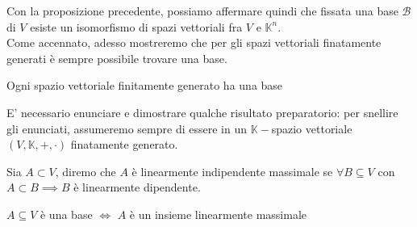 Con la proposizione precedente, possiamo affermare quindi che fissata una base $\mathcal{B}$ di $V$ esiste un isomorfismo di spazi vettoriali fra $V$ e $\mathbb{K}^n$. \\
Come accennato, adesso mostreremo che per gli spazi vettoriali finatamente generati è sempre possibile trovare una base.
\begin{theorem}
    \label{thm:base} Ogni spazio vettoriale finitamente generato ha una base
\end{theorem}
E' necessario enunciare e dimostrare qualche risultato preparatorio: per snellire gli enunciati, assumeremo sempre di essere in un $\mathbb{K}-$spazio vettoriale $(V, \mathbb{K}, +, \cdot)$ finatamente generato.
\begin{definition}
    Sia $A \subset V$, diremo che $A$ è linearmente indipendente massimale se $\forall B \subseteq V$ con $A \subset B \implies B$ è linearmente dipendente.
\end{definition}
\begin{lemma}
    $A \subseteq V$ è una base $\iff$ $A$ è un insieme linearmente massimale
\end{lemma}

